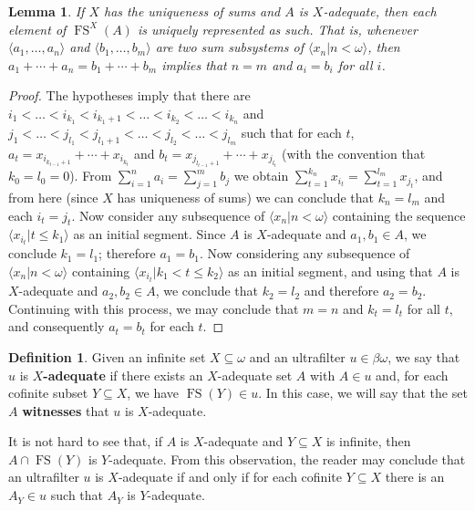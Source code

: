 \documentclass[10pt]{amsart}
\DeclareMathOperator{\fs}{FS}
\newtheorem{lemma}[theorem]{Lemma}
\theoremstyle{definition}
\newtheorem{definition}[theorem]{Definition}
\theoremstyle{remark}
\begin{document}
\begin{lemma}\label{lem:uniquenessfsnx}
    If $X$ has the uniqueness of sums and $A$ is $X$-adequate, then each element of $\fs^X(A)$ is uniquely represented as such. That is, whenever $\langle a_1,\ldots,a_n\rangle$ and $\langle b_1,\ldots,b_m\rangle$ are two sum subsystems of $\langle x_n\big|n<\omega\rangle$, then $a_1+\cdots+a_n=b_1+\cdots+b_m$ implies that $n=m$ and $a_i=b_i$ for all $i$.
\end{lemma}

\begin{proof}
    The hypotheses imply that there are $i_1<\ldots<i_{k_1}<i_{k_1+1}<\ldots<i_{k_2}<\ldots<i_{k_n}$ and $j_1<\ldots<j_{l_1}<j_{l_1+1}<\ldots<j_{l_2}<\ldots<j_{l_m}$ such that for each $t$, $a_t=x_{i_{k_{t-1}+1}}+\cdots+x_{i_{k_t}}$ and $b_t=x_{j_{l_{t-1}+1}}+\cdots+x_{j_{l_t}}$ (with the convention that $k_0=l_0=0$). From $\sum_{i=1}^n a_i=\sum_{j=1}^m b_j$ we obtain $\sum_{t=1}^{k_n} x_{i_t}=\sum_{t=1}^{l_m}x_{j_t}$, and from here (since $X$ has uniqueness of sums) we can conclude that $k_n=l_m$ and each $i_t=j_t$. Now consider any subsequence of $\langle x_n\big|n<\omega\rangle$ containing the sequence $\langle x_{i_t}\big|t\leq k_1\rangle$ as an initial segment. Since $A$ is $X$-adequate and $a_1,b_1\in A$, we conclude $k_1=l_1$; therefore $a_1=b_1$. Now considering any subsequence of $\langle x_n\big|n<\omega\rangle$ containing $\langle x_{i_t}\big|k_1<t\leq k_2\rangle$ as an initial segment, and using that $A$ is $X$-adequate and $a_2,b_2\in A$, we conclude that $k_2=l_2$ and therefore $a_2=b_2$. Continuing with this process, we may conclude that $m=n$ and $k_t=l_t$ for all $t$, and consequently $a_t=b_t$ for each $t$. 
\end{proof}

\begin{definition}
Given an infinite set $X\subseteq\omega$ and an ultrafilter $u\in\beta\omega$, we say that $u$ is {\bf $X$-adequate} if there exists an $X$-adequate set $A$ with $A\in u$ and, for each cofinite subset $Y\subseteq X$, we have $\fs(Y)\in u$. In this case, we will say that the set $A$ {\bf witnesses} that $u$ is $X$-adequate.
\end{definition}

It is not hard to see that, if $A$ is $X$-adequate and $Y\subseteq X$ is infinite, then $A\cap\fs(Y)$ is $Y$-adequate. From this observation, the reader may conclude that an ultrafilter $u$ is $X$-adequate if and only if for each cofinite $Y\subseteq X$ there is an $A_Y\in u$ such that $A_Y$ is $Y$-adequate.
\end{document}
